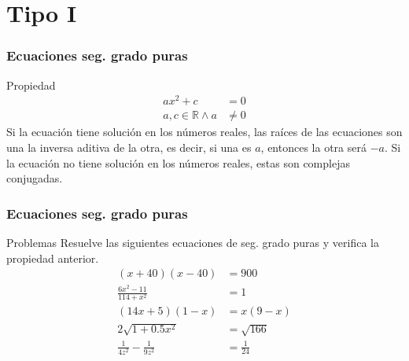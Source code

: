 \documentclass[12pt,spanish,x11names]{beamer}
\title{\talktitle}
\subtitle{\talksubtitle}
\author{\talkauthor}
\institute{\talkaffiliation}
\date{\footnotesize{\emph{\href{\talkblog}{\talkemail}}}}
\def\RR{\mathbb{R}}
\begin{document}
\begin{frame}
\titlepage
\end{frame}
\section{Tipo I}
\begin{frame}
  \frametitle{Ecuaciones seg. grado puras}
  \begin{block}{Propiedad}
    \begin{align*}
      ax^2+c&=0\\
      a,c\in\RR\wedge a&\neq0
    \end{align*}
    Si la ecuación tiene solución en los números reales, las raíces de las
    ecuaciones son una la inversa aditiva de la otra, es decir, si una es $a$,
    entonces la otra será $-a$. Si la ecuación no tiene solución en los números
    reales, estas son complejas conjugadas.
  \end{block}
\end{frame}
\begin{frame}
  \frametitle{Ecuaciones seg. grado puras}
  \begin{exampleblock}{Problemas}
    Resuelve las siguientes ecuaciones de seg. grado puras y verifica la
    propiedad anterior.
    \begin{align}
      (x+40)(x-40)&=900\\
      \frac{6x^2-11}{114+x^2}&=1\\
      (14x+5)(1-x)&=x(9-x)\\
      2\sqrt{1+0.5x^2}&=\sqrt{166}\\
      \frac{1}{4z^2}-\frac{1}{9z^2}&=\frac{1}{24}
    \end{align}
  \end{exampleblock}
\end{frame}
\end{document}
